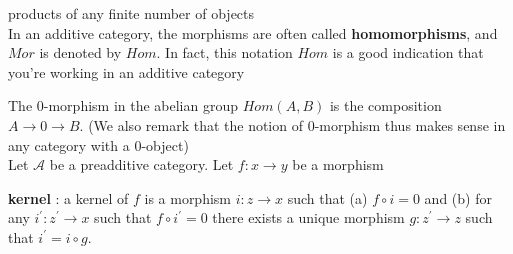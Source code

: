 \documentclass{article}
\begin{document}
products of any finite number of objects
\\

In an additive category, the morphisms are often called \textbf{homomorphisms}, and $Mor$ is denoted by $Hom$. In fact, this notation $Hom$ is a good indication that you’re
working in an additive category 

 The $0$-morphism in the abelian group $Hom(A, B)$ is the composition $A \rightarrow 0 \rightarrow B$. (We also remark that the notion
of $0$-morphism thus makes sense in any category with a $0$-object)
\\

Let $\mathscr A$ be a preadditive category. Let $f:x\rightarrow y$ be a morphism

\textbf{kernel} : a kernel of $f$ is a morphism $i:z\rightarrow x$ such that (a) $f\circ i=0$ and (b) for any $i^\prime:z^\prime\rightarrow x$ such that $f\circ i^\prime=0$ there exists a unique morphism $g:z^\prime\rightarrow z$ such that $i^\prime=i\circ g$.
\end{document}
